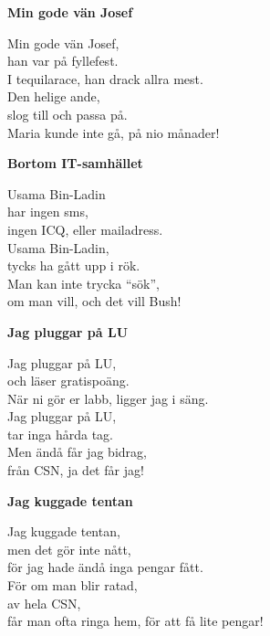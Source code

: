 \documentclass[10pt]{article}
\newenvironment{song}[2]{
	\textbf{#1}\\
	\emph{#2}\par
	\vspace{-1mm}
}{
	\vspace{2mm}
}
\begin{document}
\begin{multicols*}{2}
\vspace*{-0.2\baselineskip}
\begin{song}{Min gode vän Josef}{\vspace*{-1.2\baselineskip}}
	Min gode vän Josef,\\
	han var på fyllefest.\\
	I tequilarace, han drack allra mest.\\
	Den helige ande,\\
	slog till och passa på.\\
	Maria kunde inte gå, på nio månader!
\end{song}

\vspace*{-0.2\baselineskip}
\begin{song}{Bortom IT-samhället}{\vspace*{-1.2\baselineskip}}
	Usama Bin-Ladin\\
	har ingen sms,\\
	ingen ICQ, eller mailadress.\\
	Usama Bin-Ladin,\\
	tycks ha gått upp i rök.\\
	Man kan inte trycka ``sök'',\\
	om man vill, och det vill Bush!
\end{song}

\vspace*{-0.2\baselineskip}
\begin{song}{Jag pluggar på LU}{\vspace*{-1.2\baselineskip}}
	Jag pluggar på LU,\\
	och läser gratispoäng.\\
	När ni gör er labb, ligger jag i säng.\\
	Jag pluggar på LU,\\
	tar inga hårda tag.\\
	Men ändå får jag bidrag,\\
	från CSN, ja det får jag!
\end{song}

\vspace*{-0.2\baselineskip}
\begin{song}{Jag kuggade tentan}{\vspace*{-1.2\baselineskip}}
	Jag kuggade tentan,\\
	men det gör inte nått,\\
	för jag hade ändå inga pengar fått.\\
	För om man blir ratad,\\
	av hela CSN,\\
	får man ofta ringa hem, för att få lite pengar!
\end{song}

\end{multicols*}
\end{document}
